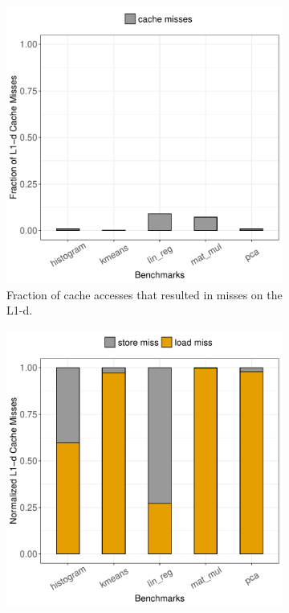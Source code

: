 \begin{figure}[htbp]
	\begin{subfigure}{0.33\textwidth}
		\centering
		\includegraphics[scale=0.4]{graphs/cache_misses_L1.pdf}
		\caption{Fraction of cache accesses that resulted in misses on the L1-d.}
	\end{subfigure}
	\begin{subfigure}{0.33\textwidth}
		\centering
		\includegraphics[scale=0.4]{graphs/all_misses_L1.pdf}

\end{subfigure}
\end{figure}
